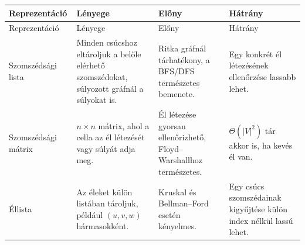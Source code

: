 \begingroup
\setlength{\tabcolsep}{4pt}
\begin{longtable}{L{0.23\textwidth}L{0.30\textwidth}L{0.20\textwidth}L{0.17\textwidth}}
\toprule
Reprezentáció & Lényege & Előny & Hátrány \\
\midrule
\endfirsthead
\toprule
Reprezentáció & Lényege & Előny & Hátrány \\
\midrule
\endhead
Szomszédsági lista & Minden csúcshoz eltároljuk a belőle elérhető szomszédokat, súlyozott gráfnál a súlyokat is. & Ritka gráfnál tárhatékony, a BFS/DFS természetes bemenete. & Egy konkrét él létezésének ellenőrzése lassabb lehet. \\
Szomszédsági mátrix & $n\times n$ mátrix, ahol a cella az él létezését vagy súlyát adja meg. & Él létezése gyorsan ellenőrizhető, Floyd--Warshallhoz természetes. & $\Theta(|V|^2)$ tár akkor is, ha kevés él van. \\
Éllista & Az éleket külön listában tároljuk, például $(u,v,w)$ hármasokként. & Kruskal és Bellman--Ford esetén kényelmes. & Egy csúcs szomszédainak kigyűjtése külön index nélkül lassú lehet. \\
\bottomrule
\end{longtable}
\endgroup
